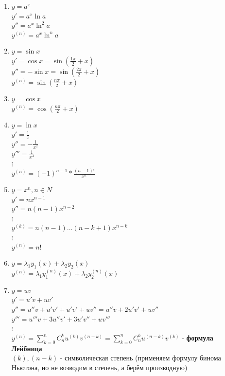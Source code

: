 \documentclass[12pt]{article}
\begin{document}
    \begin{enumerate}
        \item $y = a^x$\\
        $y' = a^x \ln a$\\
        $y'' = a^x \ln^2 a$\\
        $y^{(n)} = a^x \ln^n a$
        \item $y = \sin x$\\
        $y' = \cos x = \sin (\frac{1 \pi}{2} + x)$\\
        $y'' = - \sin x = \sin (\frac{2 \pi}{2} + x)$\\
        $y^{(n)} = \sin (\frac{n \pi}{2} + x)$
        \item $y = \cos x$\\
        $y^{(n)} = \cos (\frac{n \pi}{2} + x)$
        \item $y = \ln x$\\
        $y' = \frac{1}{x}$\\
        $y'' = -\frac{1}{x^2}$\\
        $y''' = \frac{1}{x^3}$\\
        $\vdots$\\
        $y^{(n)} = (-1)^{n-1} * \frac{(n-1)!}{x^n}$
        \item $y = x^n, n \in N$\\
        $y' = nx^{n-1}$\\
        $y'' = n(n-1)x^{n-2}$\\
        $\vdots$\\
        $y^{(k)} = n(n-1)\dots(n-k+1)x^{n-k}$\\
        $\vdots$\\
        $y^{(n)} = n!$
        \item $y = \lambda_1 y_1(x) + \lambda_2 y_2(x)$\\
        $y^{(n)} = \lambda_1 y_1^{(n)}(x) + \lambda_2 y_2^{(n)}(x)$
        \item $y = uv$\\
        $y' = u'v + uv'$\\
        $y'' = u''v + u'v' + u'v' + uv'' = u''v + 2u'v' + uv''$\\
        $y''' = u'''v + 3u''v' + 3u'v'' + uv'''$\\
        $\vdots$\\
        $y^{(n)} = \sum_{k=0}^{n} C^k_n u^{(k)} v^{(n-k)} = \sum_{k=0}^{n} C^k_n u^{(n-k)} v^{(k)}$ - \textbf{формула Лейбница}\\
        $(k), (n-k)$ - символическая степень (применяем формулу бинома Ньютона, но не возводим в степень, а берём производную)
    \end{enumerate}
\end{document}
